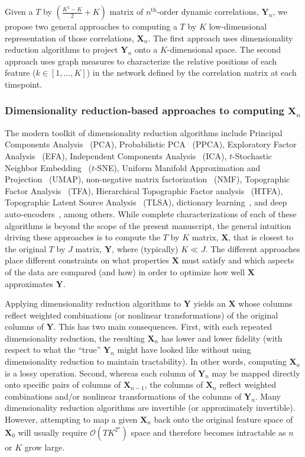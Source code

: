 \documentclass[english]{article}
\begin{document}
Given a $T$ by $\left( \frac{K^2 - K}{2} + K \right)$ matrix of
$n^\mathrm{th}$-order dynamic correlations, $\mathbf{Y}_n$, we propose
two general approaches to computing a $T$ by $K$ low-dimensional
representation of those correlations, $\mathbf{X}_n$.  The first
approach uses dimensionality reduction algorithms to project
$\mathbf{Y}_n$ onto a $K$-dimensional space.  The second approach uses
graph measures to characterize the relative positions of each feature
($k \in \left[1, ..., K \right]$) in the network defined by the
correlation matrix at each timepoint.

\subsubsection*{Dimensionality reduction-based approaches to computing
  $\mathbf{X}_n$}

The modern toolkit of dimensionality reduction algorithms include
Principal Components Analysis~\cite{Pear01} (PCA), Probabilistic
PCA~\cite{TippBish99} (PPCA), Exploratory Factor
Analysis~\cite{Spea04} (EFA), Independent Components
Analysis~\cite{JuttHera91, ComoEtal91} (ICA), $t$-Stochastic
Neighbor Embedding~\cite{vandHint08} ($t$-SNE), Uniform Manifold
Approximation and Projection~\cite{McInEtal18} (UMAP), non-negative
matrix factorization~\cite{LeeSeun99} (NMF), Topographic Factor
Analysis~\cite{MannEtal14b} (TFA), Hierarchical Topographic Factor
analysis~\cite{MannEtal18} (HTFA), Topographic Latent Source
Analysis~\cite{GersEtal11} (TLSA), dictionary
learning~\cite{MairEtal09a, MairEtal09b}, and deep
auto-encoders~\cite{HintSala06}, among others.  While complete
characterizations of each of these algorithms is beyond the scope of
the present manuscript, the general intuition driving these approaches
is to compute the $T$ by $K$ matrix, $\mathbf{X}$, that is closest to
the original $T$ by $J$ matrix, $\mathbf{Y}$, where (typically)
$K \ll J$.  The different approaches place different constraints on
what properties $\mathbf{X}$ must satisfy and which aspects of the
data are compared (and how) in order to optimize how well
$\mathbf{X}$ approximates $\mathbf{Y}$.

Applying dimensionality reduction algorithms to $\mathbf{Y}$ yields an
$\mathbf{X}$ whose columns reflect weighted combinations (or nonlinear
transformations) of the original columns of $\mathbf{Y}$.  This has
two main consequences.  First, with each repeated dimensionality
reduction, the resulting $\mathbf{X}_n$ has lower and lower fidelity
(with respect to what the ``true'' $\mathbf{Y}_n$ might have looked
like without using dimensionality reduction to maintain tractability).
In other words, computing $\mathbf{X}_n$ is a lossy operation.
Second, whereas each column of $\mathbf{Y}_n$ may be mapped
directly onto specific pairs of columns of $\mathbf{X}_{n-1}$, the
columns of $\mathbf{X}_n$ reflect weighted combinations and/or
nonlinear transformations of the columns of $\mathbf{Y}_n$.  Many
dimensionality reduction algorithms are invertible (or approximately
invertible).  However, attempting to map a given $\mathbf{X}_n$ back
onto the original feature space of $\mathbf{X}_0$ will usually require
$\mathcal{O}(TK^{2^n})$ space and therefore becomes intractable
as $n$ or $K$ grow large.
\end{document}
